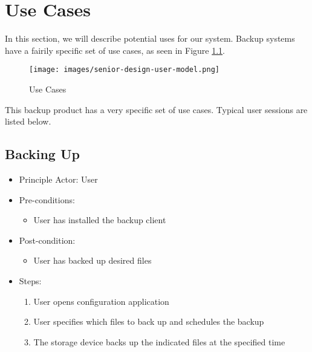 \chapter{Use Cases}
In this section, we will describe potential uses for our system. Backup systems have a fairily specific set of use cases, as seen in Figure \ref{fig:usecases}.

\begin{figure}[h]
\centering\texttt{[image: images/senior-design-user-model.png]}
\caption{Use Cases}
\label{fig:usecases}
\end{figure}

This backup product has a very specific set of use cases. Typical user sessions are listed below.

\section{Backing Up}
\begin{itemize}
	\item Principle Actor: User
	\item Pre-conditions: 
		\begin{itemize}
			\item User has installed the backup client 
		\end{itemize}
	\item Post-condition:
			\begin{itemize}
				\item User has backed up desired files
			\end{itemize}
	\item Steps:
		\begin{enumerate}
			\item User opens configuration application
			\item User specifies which files to back up and schedules the backup
			\item The storage device backs up the indicated files at the specified time
		\end{enumerate}
\end{itemize}
